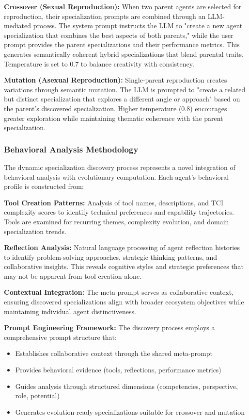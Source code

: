 \textbf{Crossover (Sexual Reproduction):} When two parent agents are selected for reproduction, their specialization prompts are combined through an LLM-mediated process. The system prompt instructs the LLM to "create a new agent specialization that combines the best aspects of both parents," while the user prompt provides the parent specializations and their performance metrics. This generates semantically coherent hybrid specializations that blend parental traits. Temperature is set to 0.7 to balance creativity with consistency.

\textbf{Mutation (Asexual Reproduction):} Single-parent reproduction creates variations through semantic mutation. The LLM is prompted to "create a related but distinct specialization that explores a different angle or approach" based on the parent's discovered specialization. Higher temperature (0.8) encourages greater exploration while maintaining thematic coherence with the parent specialization.

\subsubsection{Behavioral Analysis Methodology}

The dynamic specialization discovery process represents a novel integration of behavioral analysis with evolutionary computation. Each agent's behavioral profile is constructed from:

\textbf{Tool Creation Patterns:} Analysis of tool names, descriptions, and TCI complexity scores to identify technical preferences and capability trajectories. Tools are examined for recurring themes, complexity evolution, and domain specialization trends.

\textbf{Reflection Analysis:} Natural language processing of agent reflection histories to identify problem-solving approaches, strategic thinking patterns, and collaborative insights. This reveals cognitive styles and strategic preferences that may not be apparent from tool creation alone.

\textbf{Contextual Integration:} The meta-prompt serves as collaborative context, ensuring discovered specializations align with broader ecosystem objectives while maintaining individual agent distinctiveness.

\textbf{Prompt Engineering Framework:} The discovery process employs a comprehensive prompt structure that:
\begin{itemize}
    \item Establishes collaborative context through the shared meta-prompt
    \item Provides behavioral evidence (tools, reflections, performance metrics)
    \item Guides analysis through structured dimensions (competencies, perspective, role, potential)
    \item Generates evolution-ready specializations suitable for crossover and mutation
\end{itemize}

